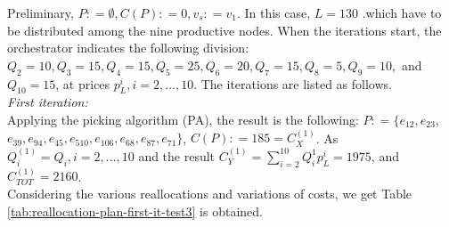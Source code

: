 Preliminary, $P : = \emptyset, C(P) : = 0, v_s : = v_1$. In this case, $L = 130$ .which have to be distributed among the nine productive nodes. When the iterations start, the orchestrator indicates the following division: $Q_2 = 10, Q_3 = 15, Q_4 = 15, Q_5 = 25, Q_6 = 20, Q_7 = 15, Q_8 = 5, Q_9 = 10,$ and $Q_10 = 15$, at prices $p_L^i , i=2,...,10$. The iterations are listed as follows.\\

\textit{First iteration:}\\
Applying the picking algorithm (PA), the result is the following: $P : = \{e_{12}, e_{23},$ $e_{39},e_{94}, e_{45}, e_{510}, e_{106}, e_{68}, e_{87}, e_{71} \}$, $C(P) : = 185 = C_X^{(1)}$. As $Q_i^{(1)} = Q_i, i=2,...,10$ and the result $C_Y^{(1)} = \sum^{10}_{i=2} Q_i^{1} p_L^i = 1975$, and $C_{TOT}^{(1)} = 2160$.\\
Considering the various reallocations and variations of costs, we get Table \ref{tab:reallocation-plan-first-it-test3} is obtained.

